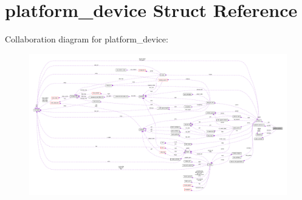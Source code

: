 \hypertarget{structplatform__device}{}\section{platform\+\_\+device Struct Reference}
\label{structplatform__device}


Collaboration diagram for platform\+\_\+device\+:
\nopagebreak
\begin{figure}[H]
\begin{center}
\leavevmode
\includegraphics[width=350pt]{structplatform__device__coll__graph}
\end{center}
\end{figure}
